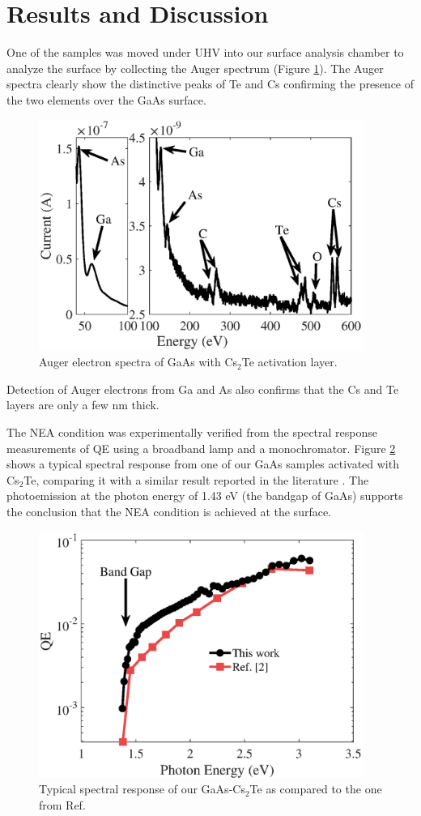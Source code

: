 \section{Results and Discussion}

One of the samples was moved under UHV into our surface analysis chamber to analyze the surface by collecting the Auger spectrum (Figure \ref{auger}). The Auger spectra clearly show the distinctive peaks of Te and Cs confirming the presence of the two elements over the GaAs surface.
\begin{figure}
    \centering
    \includegraphics[width=300pt]{figs/CsTe/auger.eps}
    \caption{Auger electron spectra of GaAs with Cs$_2$Te activation layer.}
    \label{auger}
\end{figure}
Detection of Auger electrons from Ga and As also confirms that the Cs and Te layers are only a few nm thick. 

The NEA condition was experimentally verified from the spectral response measurements of QE using a broadband lamp and a monochromator. Figure \ref{spectral} shows a typical spectral response from one of our GaAs samples activated with Cs$_2$Te, comparing it with a similar result reported in the literature \cite{kuriki2015_GaAsPhotocathodeActivation}. The photoemission at the photon energy of 1.43 eV (the bandgap of GaAs) supports the conclusion that the NEA condition is achieved at the surface.

\begin{figure}
    \centering
    \includegraphics[width=300pt]{figs/CsTe/spectral.eps}
    \caption{Typical spectral response of our GaAs-Cs$_2$Te as compared to the one from Ref.\cite{kuriki2015_GaAsPhotocathodeActivation}}
    \label{spectral}
\end{figure}

